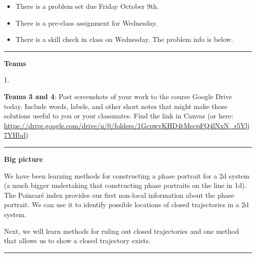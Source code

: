 \documentclass[12pt,letterpaper,noanswers]{exam}
\begin{document}
 \pdfpageheight 11in 
  \pdfpagewidth 8.5in

\noindent 




\begin{itemize}
    \item There is a problem set due Friday October 9th.
    \item There is a pre-class assignment for Wednesday.
    \item There is a skill check in class on Wednesday.  The problem info is below.
\end{itemize}

\hrule
\vspace{0.2cm}





\noindent\textbf{Teams}

\begin{multicols}{2}
1. 

\end{multicols}

\noindent \textbf{Teams 3 and 4}: Post screenshots of your work to the course Google Drive today.  Include words, labels, and other short notes that might make those solutions useful to you or your classmates.  Find the link in Canvas (or here: \url{https://drive.google.com/drive/u/0/folders/1GcpwvKHD4tMecpFQ4lNxN_r5Ylj7YHbd})

\vspace{0.2cm}

\hrule
\vspace{0.2cm}

\noindent\textbf{Big picture}

We have been learning methods for constructing a phase portrait for a 2d system (a much bigger undertaking that constructing phase portraits on the line in 1d).  The Poincar\'e index provides our first non-local information about the phase portrait.  We can use it to identify possible locations of closed trajectories in a 2d system.

Next, we will learn methods for ruling out closed trajectories and one method that allows us to show a closed trajectory exists.

\vspace{0.2cm}

\hrule
\vspace{0.2cm}
\end{document}
